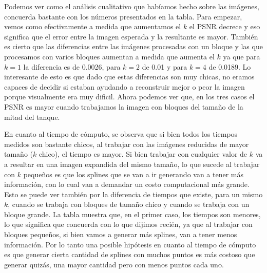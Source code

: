 \documentclass[a4paper]{article}
\begin{document}
Podemos ver como el análisis cualitativo que habíamos hecho sobre las imágenes, concuerda bastante con los números presentados en la tabla. Para empezar, vemos como efectivamente a medida que aumentamos el $k$ el PSNR decrece y eso significa que el error entre la imagen esperada y la resultante es mayor. También es cierto que las diferencias entre las imágenes procesadas con un bloque y las que procesamos con varios bloques aumentan a medida que aumenta el $k$ ya que para $k = 1$ la diferencia es de 0.0026, para $k = 2$ de 0.01 y para $k = 4$ de 0.0189. Lo interesante de esto es que dado que estas diferencias son muy chicas, no eramos capaces de decidir si estaban ayudando a reconstruir mejor o peor la imagen porque visualmente era muy dificil. Ahora podemos ver que, en los tres casos el PSNR es mayor cuando trabajamos la imagen con bloques del tamaño de la mitad del tanque.
\par En cuanto al tiempo de cómputo, se observa que si bien todos los tiempos medidos son bastante chicos, al trabajar con las imágenes reducidas de mayor tamaño ($k$ chico), el tiempo es mayor. Si bien trabajar con cualquier valor de $k$ va a resultar en una imagen expandida del mismo tamaño, lo que sucede al trabajar con $k$ pequeños es que los splines que se van a ir generando van a tener más información, con lo cual van a demandar un costo computacional más grande. Esto se puede ver también por la diferencia de tiempos que existe, para un mismo $k$, cuando se trabaja con bloques de tamaño chico y cuando se trabaja con un bloque grande. La tabla muestra que, en el primer caso, los tiempos son menores, lo que significa que concuerda con lo que dijimos recién, ya que al trabajar con bloques pequeños, si bien vamos a generar más splines, van a tener menos información. Por lo tanto una posible hipótesis en cuanto al tiempo de cómputo es que generar cierta cantidad de splines con muchos puntos es más costoso que generar quizás, una mayor cantidad pero con menos puntos cada uno.
\end{document}
